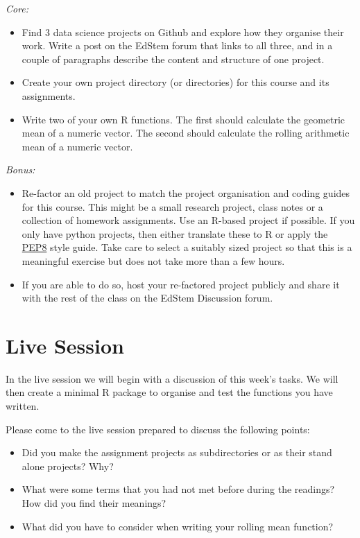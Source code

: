 \documentclass[
  12pt,
]{book}
\begin{document}
\emph{Core:}

\begin{itemize}
\item
  Find 3 data science projects on Github and explore how they organise their work. Write a post on the EdStem forum that links to all three, and in a couple of paragraphs describe the content and structure of one project.
\item
  Create your own project directory (or directories) for this course and its assignments.
\item
  Write two of your own R functions. The first should calculate the geometric mean of a numeric vector. The second should calculate the rolling arithmetic mean of a numeric vector.
\end{itemize}

\emph{Bonus:}

\begin{itemize}
\item
  Re-factor an old project to match the project organisation and coding guides for this course. This might be a small research project, class notes or a collection of homework assignments. Use an R-based project if possible. If you only have python projects, then either translate these to R or apply the \href{https://peps.python.org/pep-0008/}{PEP8} style guide. Take care to select a suitably sized project so that this is a meaningful exercise but does not take more than a few hours.
\item
  If you are able to do so, host your re-factored project publicly and share it with the rest of the class on the EdStem Discussion forum.
\end{itemize}

\hypertarget{live-session}{%
\section{Live Session}\label{live-session}}

In the live session we will begin with a discussion of this week's tasks. We will then create a minimal R package to organise and test the functions you have written.

Please come to the live session prepared to discuss the following points:

\begin{itemize}
\item
  Did you make the assignment projects as subdirectories or as their stand alone projects? Why?
\item
  What were some terms that you had not met before during the readings? How did you find their meanings?
\item
  What did you have to consider when writing your rolling mean function?
\end{itemize}
\end{document}
